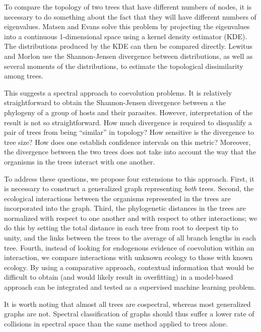 To compare the topology of two trees that have different numbers of nodes, it is necessary to do something about the fact that they will have different numbers of eigenvalues. Matsen and Evans \cite{matsen2012ubiquity} solve this problem by projecting the eigenvalues into a continuous 1-dimensional space using a kernel density estimator (KDE). The distributions produced by the KDE can then be compared directly. Lewitus and Morlon \cite{lewitus2015characterizing} use the Shannon-Jensen divergence between distributions, as well as several moments of the distributions, to estimate the topological dissimilarity among trees.  

This suggests a spectral approach to coevolution problems. It is relatively straightforward to obtain the Shannon-Jensen divergence between a the phylogeny of a group of hosts and their parasites. However, interpretation of the result is not so straightforward. How much divergence is required to disqualify a pair of trees from being ``similar'' in topology? How sensitive is the divergence to tree size? How does one establish confidence intervals on this metric? Moreover, the divergence between the two trees does not take into account the way that the organisms in the trees interact with one another. 

To address these questions, we propose four extensions to this approach. First, it is necessary to construct a generalized graph representing {\em both} trees. Second, the ecological interactions between the organisms represented in the trees are incorporated into the graph. Third, the phylogenetic distances in the trees are normalized with respect to one another and with respect to other interactions; we do this by setting the total distance in each tree from root to deepest tip to unity, and the links between the trees to the average of all branch lengths in each tree. Fourth, instead of looking for endogenous evidence of coevolution within an interaction, we compare interactions with unknown ecology to those with known ecology. By using a comparative approach, contextual information that would be difficult to obtain (and would likely result in overfitting) in a model-based approach can be integrated and tested as a supervised machine learning problem.

It is worth noting that almost all trees are cospectral, \cite{schwenk1973almost} whereas most generalized graphs are not. Spectral classification of graphs should thus suffer a lower rate of collisions in spectral space than the same method applied to trees alone. 